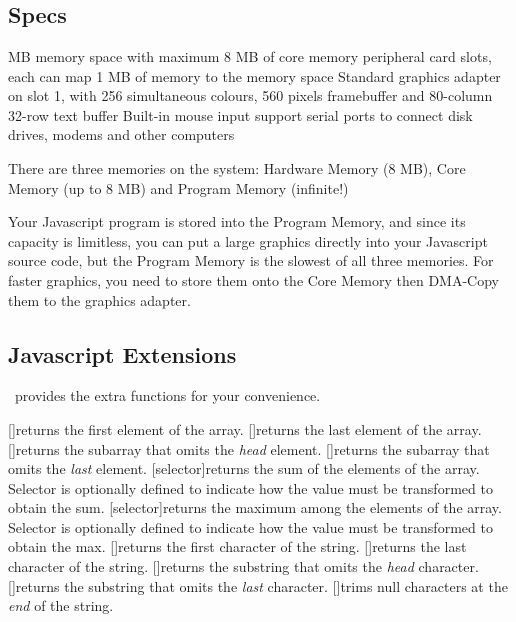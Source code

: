 \chapter{\thismachine}

\section{Specs}

\begin{outline}
 MB memory space with maximum 8 MB of core memory
 peripheral card slots, each can map 1 MB of memory to the memory space
\1 Standard graphics adapter on slot 1, with 256 simultaneous colours, 560 pixels framebuffer and 80-column 32-row text buffer
\1 Built-in mouse input support
 serial ports to connect disk drives, modems and other computers
\end{outline}

There are three memories on the system: Hardware Memory (8 MB), Core Memory (up to 8 MB) and Program Memory (infinite!)

Your Javascript program is stored into the Program Memory, and since its capacity is limitless, you can put a large graphics directly into your Javascript source code, but the Program Memory is the slowest of all three memories. For faster graphics, you need to store them onto the Core Memory then DMA-Copy them to the graphics adapter.

\section{Javascript Extensions}

\thismachine\ provides the extra functions for your convenience.

\begin{outline}
\1[]{returns the first element of the array.}
\1[]{returns the last element of the array.}
\1[]{returns the subarray that omits the \emph{head} element.}
\1[]{returns the subarray that omits the \emph{last} element.}
\1[selector]{returns the sum of the elements of the array. Selector is optionally defined to indicate how the value must be transformed to obtain the sum.}
\1[selector]{returns the maximum among the elements of the array. Selector is optionally defined to indicate how the value must be transformed to obtain the max.}
\1[]{returns the first character of the string.}
\1[]{returns the last character of the string.}
\1[]{returns the substring that omits the \emph{head} character.}
\1[]{returns the substring that omits the \emph{last} character.}
\1[]{trims null characters at the \emph{end} of the string.}
\end{outline}



